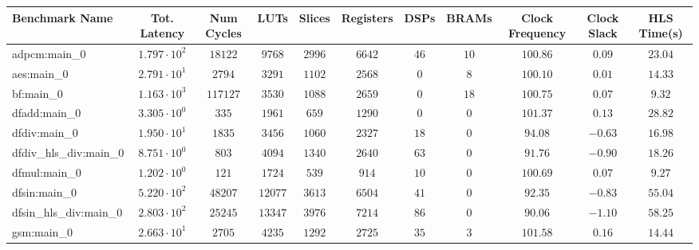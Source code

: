 \begin{tabular}{|l|c|c|c|c|c|c|c|c|c|c|}
\hline
Benchmark Name          & Tot. Latency           & Num Cycles & LUTs      & Slices    & Registers & DSPs    & BRAMs   & Clock Frequency & Clock Slack & HLS Time(s) \\
\hline
adpcm:main\_0           & $ 1.797 \cdot 10^{2} $ & $ 18122  $ & $ 9768  $ & $ 2996  $ & $ 6642  $ & $ 46  $ & $ 10  $ & $ 100.86      $ & $ 0.09    $ & $ 23.04   $ \\
aes:main\_0             & $ 2.791 \cdot 10^{1} $ & $ 2794   $ & $ 3291  $ & $ 1102  $ & $ 2568  $ & $ 0   $ & $ 8   $ & $ 100.10      $ & $ 0.01    $ & $ 14.33   $ \\
bf:main\_0              & $ 1.163 \cdot 10^{3} $ & $ 117127 $ & $ 3530  $ & $ 1088  $ & $ 2659  $ & $ 0   $ & $ 18  $ & $ 100.75      $ & $ 0.07    $ & $ 9.32    $ \\
dfadd:main\_0           & $ 3.305 \cdot 10^{0} $ & $ 335    $ & $ 1961  $ & $ 659   $ & $ 1290  $ & $ 0   $ & $ 0   $ & $ 101.37      $ & $ 0.13    $ & $ 28.82   $ \\
dfdiv:main\_0           & $ 1.950 \cdot 10^{1} $ & $ 1835   $ & $ 3456  $ & $ 1060  $ & $ 2327  $ & $ 18  $ & $ 0   $ & $ 94.08       $ & $ -0.63   $ & $ 16.98   $ \\
dfdiv\_hls\_div:main\_0 & $ 8.751 \cdot 10^{0} $ & $ 803    $ & $ 4094  $ & $ 1340  $ & $ 2640  $ & $ 63  $ & $ 0   $ & $ 91.76       $ & $ -0.90   $ & $ 18.26   $ \\
dfmul:main\_0           & $ 1.202 \cdot 10^{0} $ & $ 121    $ & $ 1724  $ & $ 539   $ & $ 914   $ & $ 10  $ & $ 0   $ & $ 100.69      $ & $ 0.07    $ & $ 9.27    $ \\
dfsin:main\_0           & $ 5.220 \cdot 10^{2} $ & $ 48207  $ & $ 12077 $ & $ 3613  $ & $ 6504  $ & $ 41  $ & $ 0   $ & $ 92.35       $ & $ -0.83   $ & $ 55.04   $ \\
dfsin\_hls\_div:main\_0 & $ 2.803 \cdot 10^{2} $ & $ 25245  $ & $ 13347 $ & $ 3976  $ & $ 7214  $ & $ 86  $ & $ 0   $ & $ 90.06       $ & $ -1.10   $ & $ 58.25   $ \\
gsm:main\_0             & $ 2.663 \cdot 10^{1} $ & $ 2705   $ & $ 4235  $ & $ 1292  $ & $ 2725  $ & $ 35  $ & $ 3   $ & $ 101.58      $ & $ 0.16    $ & $ 14.44   $ \\

\end{tabular}
